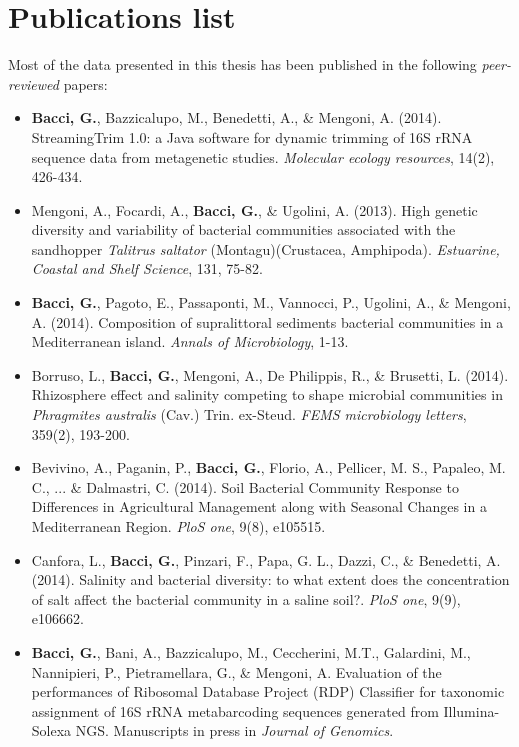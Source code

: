 
\chapter{Publications list}

Most of the data presented in this thesis has been published in the following \textit{peer-reviewed} papers:
\begin{itemize}

\item \textbf{Bacci, G.}, Bazzicalupo, M., Benedetti, A., \& Mengoni, A. (2014). StreamingTrim 1.0: a Java software for dynamic trimming of 16S rRNA sequence data from metagenetic studies. \textit{Molecular ecology resources}, 14(2), 426-434.

\item Mengoni, A., Focardi, A., \textbf{Bacci, G.}, \& Ugolini, A. (2013). High genetic diversity and variability of bacterial communities associated with the sandhopper \textit{Talitrus saltator} (Montagu)(Crustacea, Amphipoda). \textit{Estuarine, Coastal and Shelf Science}, 131, 75-82.

\item \textbf{Bacci, G.}, Pagoto, E., Passaponti, M., Vannocci, P., Ugolini, A., \& Mengoni, A. (2014). Composition of supralittoral sediments bacterial communities in a Mediterranean island. \textit{Annals of Microbiology}, 1-13.

\item Borruso, L., \textbf{Bacci, G.}, Mengoni, A., De Philippis, R., \& Brusetti, L. (2014). Rhizosphere effect and salinity competing to shape microbial communities in \textit{Phragmites australis} (Cav.) Trin. ex-Steud. \textit{FEMS microbiology letters}, 359(2), 193-200.

\item Bevivino, A., Paganin, P., \textbf{Bacci, G.}, Florio, A., Pellicer, M. S., Papaleo, M. C., ... \& Dalmastri, C. (2014). Soil Bacterial Community Response to Differences in Agricultural Management along with Seasonal Changes in a Mediterranean Region. \textit{PloS one}, 9(8), e105515.

\item Canfora, L., \textbf{Bacci, G.}, Pinzari, F., Papa, G. L., Dazzi, C., \& Benedetti, A. (2014). Salinity and bacterial diversity: to what extent does the concentration of salt affect the bacterial community in a saline soil?. \textit{PloS one}, 9(9), e106662.

\item \textbf{Bacci, G.}, Bani, A., Bazzicalupo, M., Ceccherini, M.T., Galardini, M., Nannipieri, P., Pietramellara, G., \& Mengoni, A. Evaluation of the performances of Ribosomal Database Project (RDP) Classifier for taxonomic assignment of 16S rRNA metabarcoding sequences generated from Illumina-Solexa NGS. Manuscripts in press in \textit{Journal of Genomics}.

\end{itemize}

